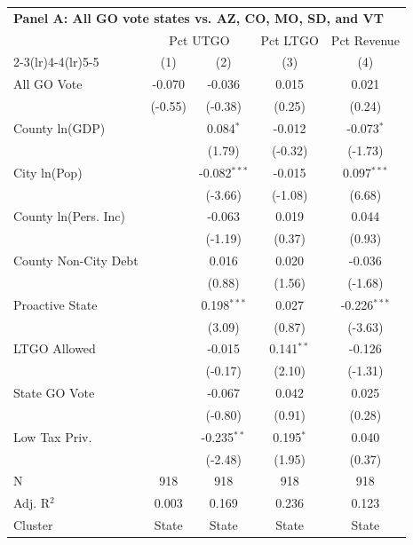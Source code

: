 \begingroup
\centering
\begin{tabular*}{\textwidth}{@{\extracolsep{\fill}}lcccc}
\multicolumn{5}{l}{\textbf{Panel A: All GO vote states vs. AZ, CO, MO, SD, and VT}}\\

\addlinespace
   \toprule
    & \multicolumn{2}{c}{Pct UTGO} & Pct LTGO & Pct Revenue\\
   \cmidrule(lr){2-3}\cmidrule(lr){4-4}\cmidrule(lr){5-5}
                        & (1)      & (2)            & (3)          & (4)\\  
   \midrule 
   All GO Vote          & -0.070   & -0.036         & 0.015        & 0.021\\   
                        & (-0.55) & (-0.38)       & (0.25)      & (0.24)\\   
   County ln(GDP)       &          & 0.084$^{*}$    & -0.012       & -0.073$^{*}$\\   
                        &          & (1.79)        & (-0.32)     & (-1.73)\\   
   City ln(Pop)         &          & -0.082$^{***}$ & -0.015       & 0.097$^{***}$\\   
                        &          & (-3.66)       & (-1.08)     & (6.68)\\   
   County ln(Pers. Inc) &          & -0.063         & 0.019        & 0.044\\   
                        &          & (-1.19)       & (0.37)      & (0.93)\\   
   County Non-City Debt &          & 0.016          & 0.020        & -0.036\\   
                        &          & (0.88)        & (1.56)      & (-1.68)\\   
   Proactive State      &          & 0.198$^{***}$  & 0.027        & -0.226$^{***}$\\   
                        &          & (3.09)        & (0.87)      & (-3.63)\\   
   LTGO Allowed         &          & -0.015         & 0.141$^{**}$ & -0.126\\   
                        &          & (-0.17)       & (2.10)      & (-1.31)\\   
   State GO Vote        &          & -0.067         & 0.042        & 0.025\\   
                        &          & (-0.80)       & (0.91)      & (0.28)\\   
   Low Tax Priv.        &          & -0.235$^{**}$  & 0.195$^{*}$  & 0.040\\   
                        &          & (-2.48)       & (1.95)      & (0.37)\\   
   \hline
   N         & 918      & 918            & 918          & 918\\  
   Adj. R$^2$       & 0.003    & 0.169          & 0.236        & 0.123\\  
   Cluster              & State & State & State & State\\  
   \bottomrule
\end{tabular*}
\par\endgroup
